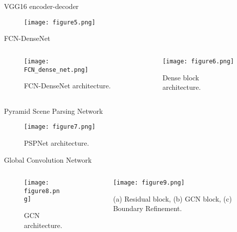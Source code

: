 \documentclass[10pt,aspectratio=169,dvipsnames]{beamer} %
\newcounter{angle}
\begin{document}
	\begin{frame}{VGG16 encoder-decoder}
		\begin{figure}
			\centering
			\texttt{[image: figure5.png]}
		\end{figure}
	\end{frame}
	
	\begin{frame}{FCN-DenseNet}
		\begin{columns}[T]
			\begin{column}[c]{0.48\textwidth}
				\begin{figure}[h!]
					\texttt{[image: FCN\_dense\_net.png]}
					\caption{FCN-DenseNet architecture.} 
					\label{fcn}
				\end{figure}
			\end{column}
			\hfill
			\begin{column}[c]{0.48\textwidth}
				\begin{figure}[h!]
					\centering
					\texttt{[image: figure6.png]}
					\caption{Dense block architecture.} 
				\end{figure}
			\end{column}
		\end{columns}
	\end{frame}
	
	\begin{frame}{Pyramid Scene Parsing Network}
		\begin{figure} [h!]
			\centering
			\texttt{[image: figure7.png]}
			\caption{PSPNet architecture.} 
		\end{figure}
	\end{frame}
	
	\begin{frame}{Global Convolution Network}
		\begin{columns}[T]
			\begin{column}[c]{0.55\textwidth}
				\begin{figure}
					\centering
					\texttt{[image: figure8.png]}
					\caption{GCN architecture.} 
				\end{figure}	
			\end{column}
			\begin{column}[c]{0.45\textwidth}
				\begin{figure}
					\centering
					\texttt{[image: figure9.png]}
					\caption{(a) Residual block, (b) GCN block, (c) Boundary Refinement.} 
				\end{figure}	
			\end{column}
		\end{columns}
	\end{frame}
	
\end{document}
